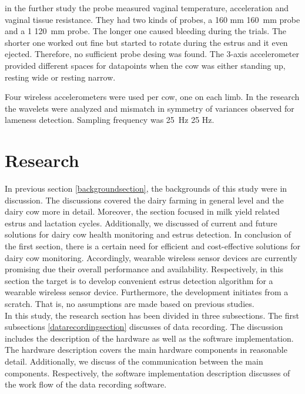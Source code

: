 \documentclass[english,12pt,a4paper,pdftex,elec,utf8]{aaltothesis}
\begin{document}
in the further study the probe measured vaginal temperature, acceleration and vaginal tissue resistance. They had two kinds of probes, a 160 mm \SI{160}{\milli \metre} probe and a 1 \SI{120}{\milli \metre} probe. The longer one caused bleeding during the trials. The shorter one worked out fine but started to rotate during the estrus and it even ejected. Therefore, no sufficient probe desing was found. The 3-axis accelerometer provided different spaces for datapoints when the cow was either standing up, resting wide or resting narrow. \cite{Andersson2016101}




Four wireless accelerometers were used per cow, one on each limb. In the research the wavelets were analyzed and mismatch in symmetry of variances observed for lameness detection. Sampling frequency was  \SI{25}{\hertz} 25 Hz.  \cite{Pastell2009545}






\clearpage

\section{Research} \label{researchsection}

In previous section \ref{backgroundsection}, the backgrounds of this study were in discussion. The discussions covered the dairy farming in general level and the dairy cow more in detail. Moreover, the section focused in milk yield related estrus and lactation cycles. Additionally, we discussed of current and future solutions for dairy cow health monitoring and estrus detection. In conclusion of the first section, there is a certain need for efficient and cost-effective solutions for dairy cow monitoring. Accordingly, wearable wireless sensor devices are currently promising due their overall performance and availability. Respectively, in this section the target is to develop convenient estrus detection algorithm for a wearable wireless sensor device. Furthermore, the development initiates from a scratch. That is, no assumptions are made based on previous studies. \\

In this study, the research section has been divided in three subsections. The first subsections \ref{datarecordingsection}  discusses of data recording. The discussion includes the description of the hardware as well as the software implementation. The hardware description covers the main hardware components in reasonable detail. Additionally, we discuss of the communication between the main components. Respectively, the software implementation description discusses of the work flow of the data recording software. \\
\end{document}
